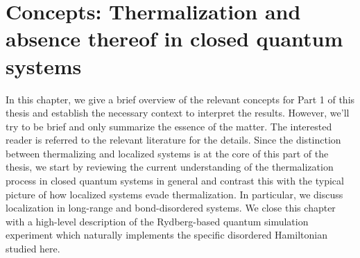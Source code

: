 \chapter{Concepts: Thermalization and absence thereof in closed quantum systems}\label{ch:concepts-thermalization}




In this chapter, we give a brief overview of the relevant concepts for Part 1 of this thesis and establish the necessary context to interpret the results. However, we'll try to be brief and only summarize the essence of the matter. The interested reader is referred to the relevant literature for the details.
Since the distinction between thermalizing and localized systems is at the core of this part of the thesis, we start by reviewing the current understanding of the thermalization process in closed quantum systems in general and contrast this with the typical picture of how localized systems evade thermalization. In particular, we discuss localization in long-range and bond-disordered systems. We close this chapter with a high-level description of the Rydberg-based quantum simulation experiment which naturally implements the specific disordered Hamiltonian studied here.  


